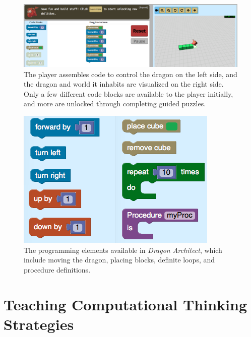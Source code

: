 \documentclass{sig-alternate}
\newcommand{\gametitle}{{\emph{Dragon Architect}}}
\begin{document}
\begin{figure}[t!]
  \centering
  \includegraphics[width=\textwidth]{images/overall-example-cropped}
  \caption{The player assembles code to control the dragon on the left side, and the dragon and world it inhabits are visualized on the right side. Only a few different code blocks are available to the player initially, and more are unlocked through completing guided puzzles.}
  \label{fig:overall}
\end{figure}

\begin{figure}[htb]
  \centering
  \includegraphics[width=\columnwidth]{images/toolbox-wide}
  \caption{The programming elements available in \gametitle{}, which include moving the dragon, placing blocks, definite loops, and procedure definitions.}
  \label{fig:toolbox}
\end{figure}

\section{Teaching Computational Thinking Strategies}
\end{document}
